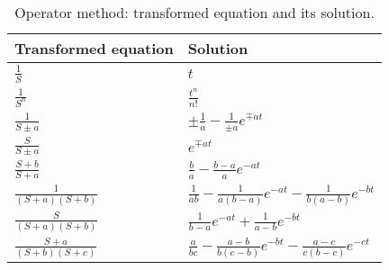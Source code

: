 \begin{table}
  \centering
  \begin{tabular}{|l|l|}
    \hline
    Transformed equation     & Solution \\ \hline\hline
    $\frac{1}{S}$            & $t$ \\
    $\frac{1}{S^n}$          & $\frac{t^n}{n!}$ \\
    $\frac{1}{S\pm a}$       & $\pm \frac{1}{a} - \frac{1}{\pm a}e^{\mp at}$ \\
    $\frac{S}{S\pm a}$       & $e^{\mp at}$ \\
    $\frac{S+b}{S+a}$        & $\frac{b}{a} - \frac{b-a}{a}e^{-at}$ \\
    $\frac{1}{(S+a)(S+b)}$   & $\frac{1}{ab} - \frac{1}{a(b-a)}e^{-at} - \frac{1}{b(a-b)}e^{-bt}$ \\
    $\frac{S}{(S+a)(S+b)}$   & $\frac{1}{b-a}e^{-at} + \frac{1}{a-b}e^{-bt}$ \\
    $\frac{S+a}{(S+b)(S+c)}$ & $\frac{a}{bc} - \frac{a-b}{b(c-b)}e^{-bt} - \frac{a-c}{c(b-c)}e^{-ct}$ \\ \hline
  \end{tabular}
  \caption{Operator method: transformed equation and its solution.}
  \label{table:operator}
\end{table}
